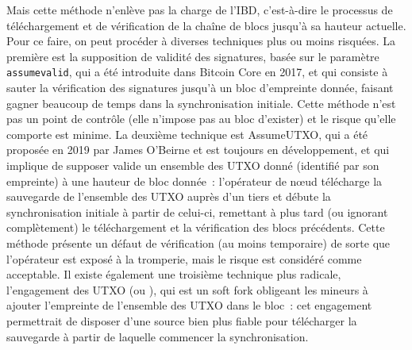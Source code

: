 Mais cette méthode n'enlève pas la charge de l'IBD, c'est-à-dire le processus de téléchargement et de vérification de la chaîne de blocs jusqu'à sa hauteur actuelle. Pour ce faire, on peut procéder à diverses techniques plus ou moins risquées. La première est la supposition de validité des signatures, basée sur le paramètre \texttt{assumevalid}, qui a été introduite dans Bitcoin Core en 2017, et qui consiste à sauter la vérification des signatures jusqu'à un bloc d'empreinte donnée, faisant gagner beaucoup de temps dans la synchronisation initiale. Cette méthode n'est pas un point de contrôle (elle n'impose pas au bloc d'exister) et le risque qu'elle comporte est minime. La deuxième technique est AssumeUTXO, qui a été proposée en 2019 par James O'Beirne et est toujours en développement, et qui implique de supposer valide un ensemble des UTXO donné (identifié par son empreinte) à une hauteur de bloc donnée~: l'opérateur de nœud télécharge la sauvegarde de l'ensemble des UTXO auprès d'un tiers et débute la synchronisation initiale à partir de celui-ci, remettant à plus tard (ou ignorant complètement) le téléchargement et la vérification des blocs précédents. Cette méthode présente un défaut de vérification (au moins temporaire) de sorte que l'opérateur est exposé à la tromperie, mais le risque est considéré comme acceptable. Il existe également une troisième technique plus radicale, l'engagement des UTXO (ou ), qui est un soft fork obligeant les mineurs à ajouter l'empreinte de l'ensemble des UTXO dans le bloc~: cet engagement permettrait de disposer d'une source bien plus fiable pour télécharger la sauvegarde à partir de laquelle commencer la synchronisation.

